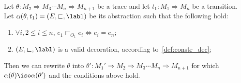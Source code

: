 
\begin{lemma}
  Let $\theta:M_2\Rightarrow M_3\cdots M_n\Rightarrow M_{n+1}$ be a trace and let $t_1:M_1\Rightarrow M_n$ be a transition. Let $\alpha(\theta,t_1) = (E,\sqsubset,\labl)$ be its abstraction such that the following hold:
  \begin{enumerate}
  \item $\forall i, 2\leq i\leq n$, $e_1\sqsubset_{O_1} e_i\iff e_i = e_n$;
  \item $(E,\sqsubset,\labl)$ is a valid decoration, according to~\autoref{def:constr_dec};
  \end{enumerate}
Then we can rewrite $\theta$ into $\theta':M_1'\Rightarrow M_2\Rightarrow M_3\cdots M_n\Rightarrow M_{n+1}$ for which $\alpha(\theta)\iso\alpha(\theta')$ and the conditions above hold.
\end{lemma}
